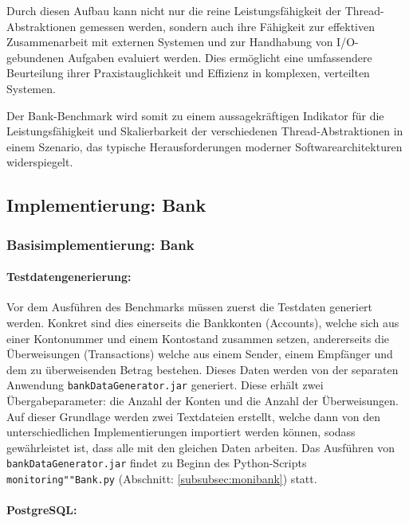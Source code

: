\documentclass[fontsize=12pt,paper=a4,twoside=semi,parskip=half-,headsepline,headinclude]{scrreprt}
\begin{document}
Durch diesen Aufbau kann nicht nur die reine Leistungsfähigkeit der Thread-Abs\-trak\-tio\-nen gemessen werden, sondern auch ihre Fähigkeit zur effektiven Zusammenarbeit mit externen Systemen und zur Handhabung von I/O-gebundenen Aufgaben evaluiert werden. Dies ermöglicht eine umfassendere Beurteilung ihrer Praxistauglichkeit und Effizienz in komplexen, verteilten Systemen.

Der Bank-Benchmark wird somit zu einem aussagekräftigen Indikator für die Leis\-tungs\-fä\-hig\-keit und Skalierbarkeit der verschiedenen Thread-Abstraktionen in einem Szenario, das typische Herausforderungen moderner Softwarearchitekturen widerspiegelt.

\subsection{Implementierung: Bank}

\subsubsection{Basisimplementierung: Bank}

\paragraph{Testdatengenerierung:}
\label{para:datagenerator}

 Vor dem Ausführen des Benchmarks müssen zuerst die Testdaten generiert werden. Konkret sind dies einerseits die Bankkonten (Accounts), welche sich aus einer Kontonummer und einem Kontostand zusammen setzen, andererseits die Überweisungen (Transactions) welche aus einem Sender, einem Empfänger und dem zu überweisenden Betrag bestehen. Dieses Daten werden von der separaten Anwendung \texttt{bankDataGenerator.jar} generiert. Diese erhält zwei Übergabeparameter: die Anzahl der Konten und die Anzahl der Überweisungen. Auf dieser Grundlage werden zwei Textdateien erstellt, welche dann von den unterschiedlichen Implementierungen importiert werden können, sodass gewährleistet ist, dass alle mit den gleichen Daten arbeiten. Das Ausführen von \texttt{bankDataGenerator.jar} findet zu Beginn des Python-Scripts \texttt{monitoring""Bank.py} (Abschnitt: \ref{subsubsec:monibank}) statt.
 
\paragraph{PostgreSQL:}
\end{document}
